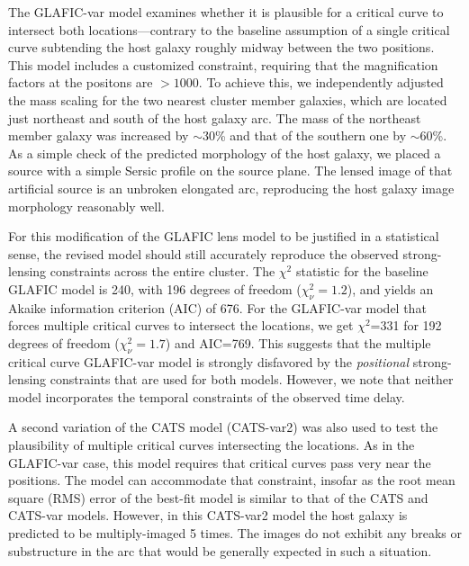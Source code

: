 The GLAFIC-var model examines whether it is plausible for a critical
curve to intersect both \spock locations---contrary to the baseline
assumption of a single critical curve subtending the \spock host
galaxy roughly midway between the two positions.  This model includes
a customized constraint, requiring that the magnification factors at
the \spock positons are $>1000$.  To achieve this, we independently
adjusted the mass scaling for the two nearest cluster member galaxies,
which are located just northeast and south of the \spock host galaxy
arc.  The mass of the northeast member galaxy was increased by
$\sim$30\% and that of the southern one by $\sim$60\%.  As a simple
check of the predicted morphology of the host galaxy, we placed a
source with a simple Sersic profile\cite{Sersic:1963} on the source
plane. The lensed image of that artificial source is an unbroken
elongated arc, reproducing the host galaxy image morphology reasonably
well.

For this modification of the GLAFIC lens model to be justified in a
statistical sense, the revised model should still accurately reproduce
the observed strong-lensing constraints across the entire cluster.
The $\chi^2$ statistic for the baseline GLAFIC model is 240, with 196
degrees of freedom ($\chi^2_\nu=1.2$), and yields an Akaike
information criterion (AIC)\citep{Akaike:1974} of 676.  For the
GLAFIC-var model that forces multiple critical curves to intersect the
\spock locations, we get $\chi^2$=331 for 192 degrees of freedom
($\chi^2_\nu=1.7$) and AIC=769.  This suggests that the multiple
critical curve GLAFIC-var model is strongly disfavored by the
{\it positional} strong-lensing constraints that are used for both models.
However, we note that neither model incorporates the temporal
constraints of the observed time delay. 

A second variation of the CATS model (CATS-var2) was also used to test
the plausibility of multiple critical curves intersecting the \spock
locations.  As in the GLAFIC-var case, this model requires that
critical curves pass very near the \spock positions.  The model can
accommodate that constraint, insofar as the root mean square (RMS)
error of the best-fit model is similar to that of the CATS and
CATS-var models.  However, in this CATS-var2 model the \spock host
galaxy is predicted to be multiply-imaged 5 times. The \HST images do
not exhibit any breaks or substructure in the arc that would be
generally expected in such a situation.  

